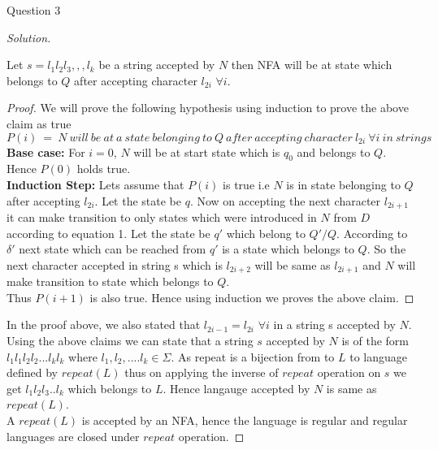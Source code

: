 \begin{solution}{Question 3}
\begin{proof}[Solution]
        \begin{claim}
            Let $s = l_1l_2l_3,,,l_k$ be a string accepted by $N$ then NFA will be at state which belongs to $Q$ after accepting character $l_{2i}$ $\forall i$.
        \end{claim}
        \begin{proof}
            We will prove the following hypothesis using induction to prove the above claim as true
            \[P(i)\ =\ N\ will\ be\ at\ a\ state\ belonging\ to\ Q\ after\ accepting\ character\ l_{2i}\ \forall i\ in\ string s\]
            \textbf{Base case:} For $i = 0$, $N$ will be at start state which is $q_0$ and belongs to $Q$. Hence $P(0)$ holds true.
            \\
            \textbf{Induction Step:} Lets assume that $P(i)$ is true i.e $N$ is in state belonging to $Q$ after accepting $l_{2i}$. Let the state be $q$. Now on accepting the next character $l_{2i+1}$ it can make transition to only states which were introduced in $N$ from $D$ according to equation 1. Let the state be $q'$ which belong to $Q'/Q$. According to $\delta'$ next state which can be reached from $q'$ is a state which belongs to $Q$. So the next character accepted in string s which is $l_{2i+2}$  will be same as $l_{2i+1}$ and $N$ will make transition to state which belongs to $Q$.\\
            Thus $P(i+1)$ is also true.
            Hence using induction we proves the above claim.
        \end{proof}
        
        In the proof above, we also stated that $l_{2i-1} = l_{2i}$ $\forall i$ in a string s accepted by $N$.\\
        
        Using the above claims we can state that a string $s$ accepted by $N$ is of the form $l_1l_1l_2l_2...l_kl_k$ where $l_1, l_2,.... l_k \in \Sigma$. As repeat is a bijection from to $L$ to language defined by $repeat(L)$ thus on applying the inverse of $repeat$ operation  on $s$ we get $l_1l_2l_3..l_k$ which belongs to $L$. Hence langauge accepted by $N$ is same as $repeat(L)$.\\
        
        A $repeat(L)$ is accepted by an NFA, hence the language is regular and regular languages are closed under $repeat$ operation.
        
    \end{proof}
\end{solution}
